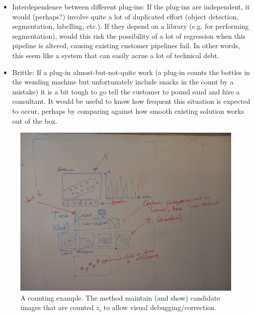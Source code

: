 \documentclass{article}
\begin{document}
\begin{itemize}
\item Interdependence between different plug-ins: If the plug-ins are independent, it would (perhaps?) involve quite a lot of duplicated effort (object detection, segmentation, labelling, etc.). If they depend on a library (e.g. for performing segmentation), would this risk the possibility of a lot of regression when this pipeline is altered, causing existing customer pipelines fail. In other words, this seem like a system that can easily acrue a lot of technical debt. 
\item Brittle: If a plug-in almost-but-not-quite work (a plug-in counts the bottles in the wending machine but unfortunately include snacks in the count by a mistake) it is a bit tough to go tell the customer to pound sand and hire a consultant. It would be useful to know  how frequent this situation is expected to occur, perhaps by comparing against how smooth existing solution works out of the box. 
\end{itemize}


\begin{figure}[t]
    \centering
    \includegraphics[width=\linewidth]{20230420_104629.jpg}
    \caption{A counting example. The method maintain (and show) candidate images that are counted $z_i$ to allow visual debugging/correction. }
    \label{fig1}
\end{figure}
\end{document}
